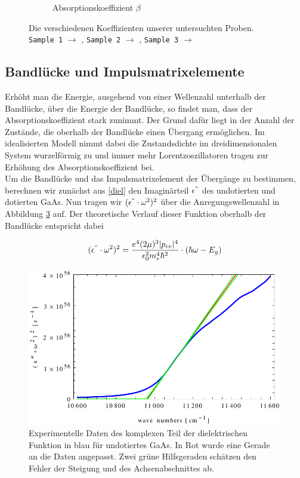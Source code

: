\documentclass[paper=a4,fontsize=10pt,DIV=18,twocolumn,parskip=half]{scrartcl}
\numberwithin{equation}{section}    %
\begin{document}
\begin{figure}
\begin{subfigure}{\columnwidth}
        \caption{Absorptionskoeffizient $\beta$}
        \label{ab}
    \end{subfigure}
    \caption{Die verschiedenen Koeffizienten unserer untersuchten Proben.  
    \texttt{Sample 1} $\rightarrow$ ,
    \texttt{Sample 2} $\rightarrow$ , 
    \texttt{Sample 3} $\rightarrow$ }
    \label{brechzahlen}
\end{figure}

\subsection{Bandlücke und Impulsmatrixelemente}

Erhöht man die Energie, ausgehend von einer Wellenzahl unterhalb der Bandlücke, 
über die Energie der Bandlücke, so findet man, dass der Absorptionskoeffizient 
stark zunimmt. Der Grund dafür liegt in der Anzahl der Zustände, die oberhalb 
der Bandlücke einen Übergang ermöglichen. Im idealisierten Modell nimmt dabei 
die Zustandsdichte im dreidimensionalen System wurzelförmig zu und immer mehr 
Lorentzoszillatoren tragen zur Erhöhung des Absorptionskoeffizient bei.\\
Um die Bandlücke und das Impulsmatrixelement der Übergänge zu bestimmen, 
berechnen wir zunächst aus \cref{diel} den Imaginärteil $\epsilon^{``}$ des 
undotierten und dotierten GaAs. Nun tragen wir $(\epsilon^{``}\cdot \omega^2)^2$ 
über die Anregungswellenzahl in Abbildung \ref{bl_dot} auf. Der theoretische Verlauf 
dieser Funktion oberhalb der Bandlücke entspricht dabei


\begin{align}
   (\epsilon^{``}\cdot \omega^2)^2=\frac{e^4 (2\mu)^3 |p_{cv}|^4}{\epsilon_0^2 
   m_e^4 \hbar^2} \cdot (\hbar \omega - E_g)
\end{align}

\begin{figure}
	\begin{center}
		\includegraphics[width=\columnwidth]{Bilder/bl_dot}
		\caption{Experimentelle Daten des komplexen Teil der dielektrischen Funktion in blau für undotiertes GaAs. In Rot wurde eine Gerade an die Daten angepasst. Zwei grüne Hilfsgeraden schätzen den Fehler der Steigung und des Achsenabschnittes ab.}
		\label{bl_dot}
	\end{center}
\end{figure}
\end{document}
